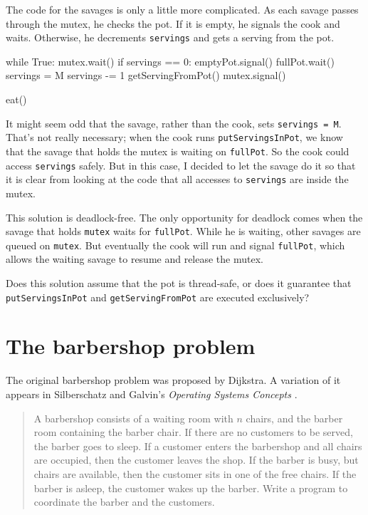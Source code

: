 \documentclass{book}
\begin{document}
The code for the savages is only a little more complicated.
As each savage passes through the mutex, he checks the pot.
If it is empty, he signals the cook and waits.  Otherwise,
he decrements {\tt servings} and gets a serving from the pot.


\begin{unbreakable}[title={Dining Savages solution (savage)}]{}
while True:
    mutex.wait()
        if servings == 0:
            emptyPot.signal()
            fullPot.wait()
            servings = M
        servings -= 1
	getServingFromPot()
    mutex.signal()

    eat()
\end{unbreakable}

It might seem odd that the savage, rather than the cook, sets
    {\tt servings = M}.  That's not really necessary; when the cook
runs {\tt putServingsInPot}, we know that the savage that holds
the mutex is waiting on {\tt fullPot}.  So the cook could
access {\tt servings} safely.  But in this case, I decided to
let the savage do it so that it is clear from looking at the
code that all accesses to {\tt servings} are inside the mutex.

This solution is deadlock-free.  The only opportunity for
deadlock comes when the savage that holds {\tt mutex} waits
for {\tt fullPot}.  While he is waiting, other savages are
queued on {\tt mutex}.  But eventually the cook will run and
signal {\tt fullPot}, which allows the waiting savage
to resume and release the mutex.

Does this solution assume that the pot is thread-safe, or does it
guarantee that {\tt putServingsInPot} and {\tt getServingFromPot}
are executed exclusively?



\section{The barbershop problem}

The original barbershop problem was proposed by
Dijkstra.  A variation of it appears in
Silberschatz and Galvin's {\em Operating Systems Concepts}
\cite{silberschatz}.

\begin {quotation}
A barbershop consists of a waiting room with $n$ chairs, and the
barber room containing the barber chair.  If there are no customers to
be served, the barber goes to sleep.  If a customer enters the
barbershop and all chairs are occupied, then the customer leaves the
shop.  If the barber is busy, but chairs are available, then the
customer sits in one of the free chairs.  If the barber is asleep, the
customer wakes up the barber.  Write a program to coordinate the
barber and the customers.
\end{quotation}
\end{document}
